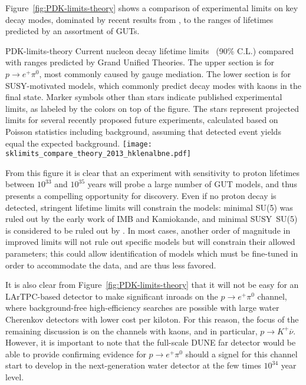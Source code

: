 Figure~\ref{fig:PDK-limits-theory} shows a comparison of experimental
limits on key decay modes, dominated by recent results from \superk, to the
ranges of lifetimes predicted by an assortment of GUTs. 
\begin{cdrfigure}
                 {PDK-limits-theory}
                 {Current nucleon decay lifetime 
                  limits~\cite{Beringer:1900zz,Nishino:2012ipa} (90\% C.L.)
                  compared with ranges predicted by 
                  Grand Unified Theories. The upper section is for
                  $p \rightarrow e^+ \pi^0$, most commonly caused by 
                  gauge mediation.  The lower section is for SUSY-motivated 
                  models, which commonly predict decay modes with kaons 
                  in the final state.  Marker symbols other than stars 
                  indicate published experimental limits, 
                  as labeled by the 
                  colors on top of the figure.  The stars represent projected 
                  limits for several recently proposed future experiments,   
                  calculated based on Poisson statistics including background, 
                  assuming that detected event yields equal the expected 
                  background.}
\texttt{[image: sklimits\_compare\_theory\_2013\_hklenalbne.pdf]}
\end{cdrfigure}
%
From this figure it is clear that an experiment with sensitivity to proton lifetimes
between $10^{33}$ and $10^{35}$ years will probe a large number of GUT models, and 
thus presents a compelling opportunity for discovery.
Even if no proton decay is detected, stringent lifetime limits will constrain 
the models: minimal SU(5) was ruled out by the early work of IMB and
Kamiokande, and minimal SUSY~SU(5) is considered to be ruled out by \superk.
In most cases, another order of magnitude in improved limits will not rule out
specific models but will constrain their allowed parameters;
this could allow identification of models which must be fine-tuned
in order to accommodate the data, and are thus less favored.

It is also clear from Figure~\ref{fig:PDK-limits-theory} that it will not be easy for 
an LArTPC-based detector to make significant inroads on the $p \rightarrow e^+ \pi^0$ 
channel, where background-free high-efficiency searches are possible with large 
water Cherenkov detectors with lower cost per kiloton.  For this reason, the 
focus of the remaining discussion is on the channels with kaons, and in particular, 
$p \rightarrow K^+ \overline{\nu}$.  However, it is important to note that 
the full-scale DUNE far detector would be able to provide confirming evidence 
for $p \rightarrow e^+ \pi^0$ should a signel for this channel start to develop 
in the next-generation water detector at the few times $10^{34}$ year level. 

